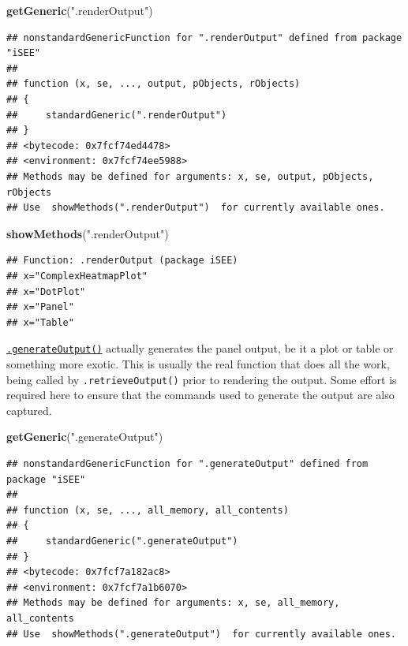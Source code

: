 \documentclass[
]{book}
\newenvironment{Shaded}{\begin{snugshade}}{\end{snugshade}}
\newcommand{\KeywordTok}[1]{\textcolor[rgb]{0.13,0.29,0.53}{\textbf{#1}}}
\newcommand{\NormalTok}[1]{#1}
\newcommand{\StringTok}[1]{\textcolor[rgb]{0.31,0.60,0.02}{#1}}
\begin{document}
\begin{Shaded}
\begin{Highlighting}[]
\KeywordTok{getGeneric}\NormalTok{(}\StringTok{".renderOutput"}\NormalTok{)}
\end{Highlighting}
\end{Shaded}

\begin{verbatim}
## nonstandardGenericFunction for ".renderOutput" defined from package "iSEE"
## 
## function (x, se, ..., output, pObjects, rObjects) 
## {
##     standardGeneric(".renderOutput")
## }
## <bytecode: 0x7fcf74ed4478>
## <environment: 0x7fcf74ee5988>
## Methods may be defined for arguments: x, se, output, pObjects, rObjects
## Use  showMethods(".renderOutput")  for currently available ones.
\end{verbatim}

\begin{Shaded}
\begin{Highlighting}[]
\KeywordTok{showMethods}\NormalTok{(}\StringTok{".renderOutput"}\NormalTok{)}
\end{Highlighting}
\end{Shaded}

\begin{verbatim}
## Function: .renderOutput (package iSEE)
## x="ComplexHeatmapPlot"
## x="DotPlot"
## x="Panel"
## x="Table"
\end{verbatim}

\href{https://isee.github.io/iSEE/reference/output-generics.html}{\texttt{.generateOutput()}} actually generates the panel output, be it a plot or table or something more exotic.
This is usually the real function that does all the work, being called by \texttt{.retrieveOutput()} prior to rendering the output.
Some effort is required here to ensure that the commands used to generate the output are also captured.

\begin{Shaded}
\begin{Highlighting}[]
\KeywordTok{getGeneric}\NormalTok{(}\StringTok{".generateOutput"}\NormalTok{)}
\end{Highlighting}
\end{Shaded}

\begin{verbatim}
## nonstandardGenericFunction for ".generateOutput" defined from package "iSEE"
## 
## function (x, se, ..., all_memory, all_contents) 
## {
##     standardGeneric(".generateOutput")
## }
## <bytecode: 0x7fcf7a182ac8>
## <environment: 0x7fcf7a1b6070>
## Methods may be defined for arguments: x, se, all_memory, all_contents
## Use  showMethods(".generateOutput")  for currently available ones.
\end{verbatim}
\end{document}
